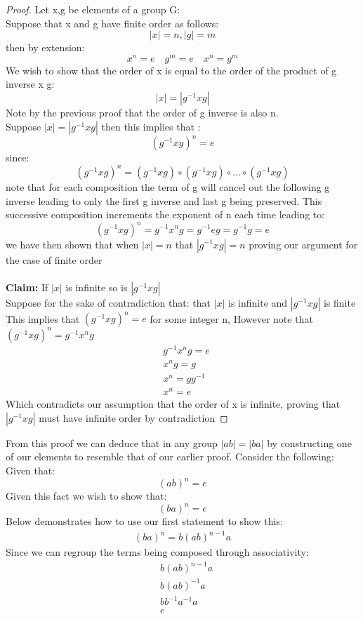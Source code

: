 \documentclass[11pt]{article}
\theoremstyle{definition}  %
\begin{document}
\begin{proof}
  Let x,g be elements of a group G: \\
  Suppose that x and g have finite order as follows:
  \[
    |x|=n, |g|=m
  \]
  then by extension:
  \[
    x^n=e\quad g^m =e \quad x^n=g^m
  \]
  We wish to show that the order of x is equal to the order of the product of g inverse x g:
  \[
    |x|=|g^{-1}xg|
  \]
  Note by the previous proof that the order of g inverse is also n. \\
  Suppose $|x|=|g^{-1}xg|$ then this implies that :
  \[
    (g^{-1}xg)^n=e
  \]
  since:
  \[
    (g^{-1}xg)^n=(g^{-1}xg)\circ (g^{-1}xg)\circ...\circ (g^{-1}xg)
  \]
  note that for each composition the term of g will cancel out the following g inverse leading to only the first g inverse and last g being preserved. This successive composition increments the exponent of n each time leading to:
  $$(g^{-1}xg)^n=g^{-1}x^ng=g^{-1}eg=g^{-1}g=e$$
  we have then shown that when $|x|=n$ that $|g^{-1}xg|=n$ proving our argument for the case of finite order\\\\
  \textbf{Claim:} If $|x|$ is infinite so is $|g^{-1}xg|$ \\

  Suppose for the sake of contradiction that:
  that $|x|$ is infinite and $|g^{-1}xg|$ is finite \\
  This implies that $(g^{-1}xg)^n=e$ for some integer n, However note that $(g^{-1}xg)^n=g^{-1}x^ng$
  \begin{align*}
    &g^{-1}x^ng=e\\
    &x^ng=g\\
    &x^n=gg^{-1}\\
    &x^n=e
  \end{align*}
  Which contradicts our assumption that the order of x is infinite, proving that $|g^{-1}xg|$ must have infinite order by contradiction
\end{proof}
From this proof we can deduce that in any group $|ab|=|ba|$ by constructing one of our elements to resemble that of our earlier proof. Consider the following:
Given that:
\[
  (ab)^n=e
\]
Given this fact we wish to show that:
\[
  (ba)^n=e
\]
Below demonstrates how to use our first statement to show this:
\begin{align*}
(ba)^n=b(ab)^{n-1}a
\end{align*}
Since we can regroup the terms being composed through associativity:
\begin{align*}
  &b(ab)^{n-1}a\\
  &b(ab)^{-1}a\\
  &bb^{-1}a^{-1}a\\
  &e
\end{align*}
\end{document}
